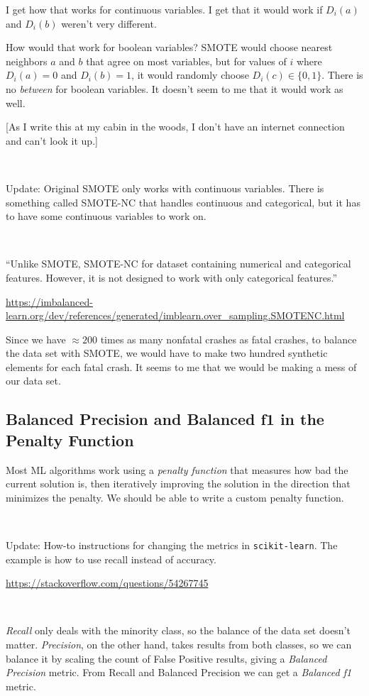 \documentclass[11pt]{article}
\begin{document}
\begin{spacing}{1.2}
I get how that works for continuous variables.  I get that it would work if $D_i(a)$ and $D_i(b)$ weren't very different.  

How would that work for boolean variables?  SMOTE would choose nearest neighbors $a$ and $b$ that agree on most variables, but for values of $i$ where $D_i(a)=0$ and $D_i(b)=1$, it would randomly choose $D_i(c) \in \{0,1\}$.  There is no {\it between} for boolean variables.  It doesn't seem to me that it would work as well.  

[As I write this at my cabin in the woods, I don't have an internet connection and can't look it up.]

\

Update:  Original SMOTE only works with continuous variables.  There is something called SMOTE-NC that handles continuous and categorical, but it has to have some continuous variables to work on.  

\

``Unlike SMOTE, SMOTE-NC for dataset containing numerical and categorical features. However, it is not designed to work with only categorical features.''

\url{https://imbalanced-learn.org/dev/references/generated/imblearn.over_sampling.SMOTENC.html}



Since we have $\approx 200$ times as many nonfatal crashes as fatal crashes, to balance the data set with SMOTE, we would have to make two hundred synthetic elements for each fatal crash.  It seems to me that we would be making a mess of our data set.  

\subsection{Balanced Precision and Balanced f1 in the Penalty Function}

Most ML algorithms work using a {\it penalty function} that measures how bad the current solution is, then iteratively improving the solution in the direction that minimizes the penalty.  We should be able to write a custom penalty function.  

\

Update:  How-to instructions for changing the metrics in {\tt scikit-learn}.  The example is how to use recall instead of accuracy.  

\url{https://stackoverflow.com/questions/54267745}


\

{\it Recall} only deals with the minority class, so the balance of the data set doesn't matter.  {\it Precision}, on the other hand, takes results from both classes, so we can balance it by scaling the count of False Positive results, giving a {\it Balanced Precision} metric.  From Recall and Balanced Precision we can get a {\it Balanced f1} metric.  


\end{spacing}
\end{document}
